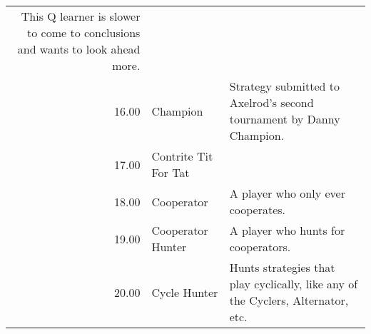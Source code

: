 \begin{tabular}{rll}
	This Q learner is slower to come to conclusions and wants to look ahead more.                                                                                                                                                                                                                                                                                                                                                                                                                                                                                                                                                                                                                                                                                                                                                                                                                                                             \\
	16.00  & Champion                    & Strategy submitted to Axelrod's second tournament by Danny Champion.                                                              \\
	17.00  & Contrite Tit For Tat        &                                                                                                                                   \\
	18.00  & Cooperator                  & A player who only ever cooperates.                                                                                                \\
	19.00  & Cooperator Hunter           & A player who hunts for cooperators.                                                                                               \\
	20.00  & Cycle Hunter                & Hunts strategies that play cyclically, like any of the Cyclers,
	                                       Alternator, etc.                                                                                                                                                                                                                                                                                                                                                                                                                                                                                                                                                                                                                                                                                                                                                                                                                                                                                                                                     \\

\end{tabular}
